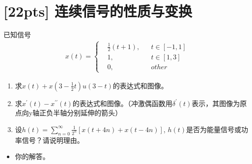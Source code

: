 \documentclass[a4paper,UTF8]{article}
\numberwithin{equation}{section}
\begin{document}
\newpage
\section{[22pts] 连续信号的性质与变换}
已知信号
\begin{equation*}
    \begin{aligned}
    x(t)=\left\{
    \begin{aligned}
    & \frac{1}{2}(t+1), && t\in[-1,1]\\
    & 1, && t\in[1,3]\\
    & 0, && other
    \end{aligned}
    \right.
    \end{aligned}
\end{equation*}
\begin{enumerate}[(1)]
	\item 求$x(t)+x(3-\displaystyle\frac{1}{2}t)u(3-t)$的表达式和图像。
	\item 求$x^{\prime}(t)-x^{\prime\prime}(t)$的表达式和图像。（冲激偶函数用$\delta^{\prime}(t)$表示，其图像为原点向y轴正负半轴分别延伸的箭头）
	\item 设$h(t)=\displaystyle\sum^{\infty}_{n=0}\frac{1}{2^n}\left[x(t+4n)+x(t-4n)\right]$, $h(t)$是否为能量信号或功率信号？请说明理由。
\end{enumerate}
	
\begin{framed}
\begin{spacing}{1.5}
    \begin{itemize}
        \item 你的解答。
    \end{itemize}
\end{spacing}
\end{framed}


\newpage
\end{document}
